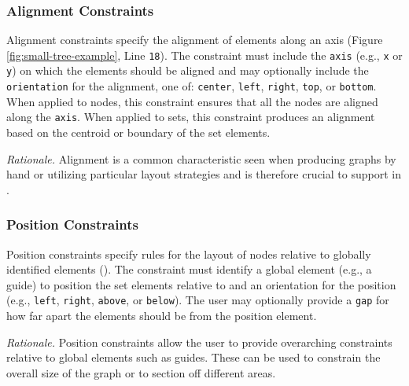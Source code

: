 \subsubsection{Alignment Constraints}
 Alignment constraints
specify the alignment of elements along an axis (Figure
\ref{fig:small-tree-example}, Line \texttt{18}). The constraint must
include the \texttt{axis} (e.g., \texttt{x} or \texttt{y}) on which the
elements should be aligned and may optionally include the
\texttt{orientation} for the alignment, one of: \texttt{center},
\texttt{left}, \texttt{right}, \texttt{top}, or \texttt{bottom}. When
applied to nodes, this constraint ensures that all the nodes are aligned
along the \texttt{axis}. When applied to sets, this constraint produces an
alignment based on the centroid or boundary of the set elements.

\emph{Rationale.} Alignment is a common characteristic seen when producing
graphs by hand  or utilizing particular layout strategies
 and is therefore crucial to support in \projectname.

\subsubsection{Position Constraints}
 Position constraints specify rules for the layout
of nodes relative to globally identified elements (). The
constraint must identify a global element (e.g., a guide) to position the
set elements relative to and an orientation for the position (e.g.,
\texttt{left}, \texttt{right}, \texttt{above}, or \texttt{below}). The user
may optionally provide a \texttt{gap} for how far apart the elements should
be from the position element.

\emph{Rationale.} Position constraints allow the user to provide
overarching constraints relative to global elements such as guides. These
can be used to constrain the overall size of the graph or to section off
different areas. 

